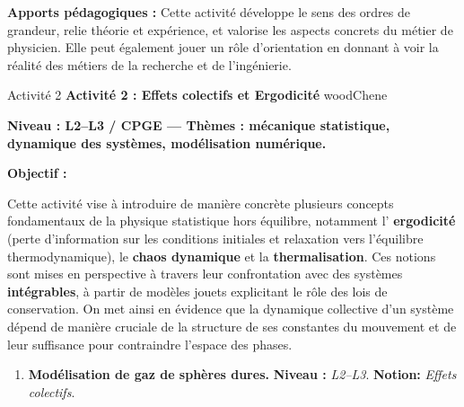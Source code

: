 {\begin{enumerate}[label =\textbf{\arabic*.}, ref=\arabic*]
    \end{enumerate}

    \textbf{Apports pédagogiques :}
    Cette activité développe le sens des ordres de grandeur, relie théorie et
    expérience, et valorise les aspects concrets du métier de physicien. Elle peut
    également jouer un rôle d’orientation en donnant à voir la réalité des métiers
    de la recherche et de l’ingénierie.
}

\EncadreDeux
{Activité 2}
{{\bf \textsf{Activité 2 : Effets colectifs et Ergodicité}}}
{woodChene}
{

\textbf{Niveau : L2--L3 / CPGE — Thèmes : mécanique statistique, dynamique des systèmes, modélisation numérique.}

\textbf{Objectif :}

Cette activité vise à introduire de manière concrète plusieurs concepts
fondamentaux de la physique statistique hors équilibre, notamment l’{\bf
ergodicité} (perte d’information sur les conditions initiales et relaxation
vers l’équilibre thermodynamique), le {\bf chaos dynamique} et la {\bf
        thermalisation}. Ces notions sont mises en perspective à travers leur
confrontation avec des systèmes {\bf intégrables}, à partir de modèles jouets
explicitant le rôle des lois de conservation. On met ainsi en évidence que la
dynamique collective d’un système dépend de manière cruciale de la structure de
ses constantes du mouvement et de leur suffisance pour contraindre l’espace des
phases.


\begin{enumerate}[label =\textbf{\arabic*.}, ref=\arabic*]

    \item {\bf \textsf{Modélisation de gaz de sphères dures.}} \textbf{Niveau :} {\em L2--L3}. \textbf{Notion:} {\em Effets colectifs}.


\end{enumerate}}
